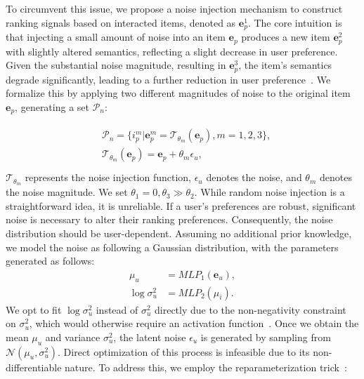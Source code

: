 To circumvent this issue, we propose a noise injection mechanism to construct ranking signals based on interacted items, denoted as $\mathbf{e}_{p}^1$. The core intuition is that injecting a small amount of noise into an item $\mathbf{e}_{p}$ produces a new item $\mathbf{e}_{p}^2$ with slightly altered semantics, reflecting a slight decrease in user preference. Given the substantial noise magnitude, resulting in $\mathbf{e}_{p}^3$, the item's semantics degrade significantly, leading to a further reduction in user preference~\cite{HHD18,ZPL23}. We formalize this by applying two different magnitudes of noise to the original item $\mathbf{e}_{p}$, generating a set $\mathcal{P}_{n}$:

\begin{equation}
\begin{split}
\begin{aligned}
&\mathcal{P}_{n} = \{ i_{p}^{m} | \mathbf{e}_{p}^{m}=\mathcal{T}_{\theta_m}(\mathbf{e}_{p}),m=1,2,3\},\\
&\mathcal{T}_{\theta_m}(\mathbf{e}_{p}) = \mathbf{e}_{p} + \theta_{m} \epsilon_{u}, \\
\end{aligned}
\end{split}
\end{equation}
$\mathcal{T}_{\theta_m}$ represents the noise injection function, $\epsilon_{u}$ denotes the noise, and $\theta_m$ denotes the noise magnitude. We set $\theta_1 = 0, \theta_3 \gg \theta_2$. While random noise injection is a straightforward idea, it is unreliable. If a user’s preferences are robust, significant noise is necessary to alter their ranking preferences. Consequently, the noise distribution should be user-dependent. Assuming no additional prior knowledge, we model the noise as following a Gaussian distribution, with the parameters generated as follows:
\begin{align}
\mu_u &= MLP_1(\mathbf{e}_{u}),\\
\log \sigma_u^2 &= MLP_2(\mu_i).
\end{align}
We opt to fit $\log \sigma_u^2$ instead of $\sigma_u^2$ directly due to the non-negativity constraint on $\sigma_u^2$, which would otherwise require an activation function~\cite{YZL23}. Once we obtain the mean $\mu_u$ and variance $\sigma_u^2$, the latent noise $\epsilon_{u}$ is generated by sampling from $\mathcal{N}(\mu_u, \sigma_u^2)$. Direct optimization of this process is infeasible due to its non-differentiable nature. To address this, we employ the reparameterization trick~\cite{CLJH22}:
